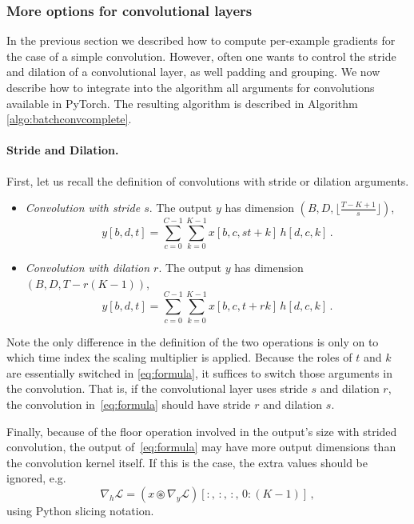 \documentclass[11pt]{article}
\begin{document}
\subsubsection{More options for convolutional layers}
%
In the previous section we described how to compute per-example gradients for
the case of a simple convolution. However, often one wants to control the 
stride and dilation of a convolutional layer, as well padding and grouping. 
We now describe how to integrate into the algorithm all arguments for
convolutions available in PyTorch. The resulting algorithm is described in
Algorithm \ref{algo:batchconvcomplete}.

\paragraph{Stride and Dilation.}
%
First, let us recall the definition of convolutions with stride or dilation arguments.\\
%
\begin{itemize}
\item \emph{Convolution with stride $s$}.  The output $y$ has dimension $(B, D, \lfloor \frac{T-K+1}{s} \rfloor)$,
\begin{equation*}
        y[b, d, t] = \sum_{c=0}^{C-1} \sum_{k=0}^{K-1} x[b, c, s t + k] \, h[d, c, k] \, .
    \end{equation*}
\item \emph{Convolution with dilation $r$}. The output $y$ has dimension $(B, D, T - r (K-1))$,
    \begin{equation*}
        y[b, d, t] = \sum_{c=0}^{C-1} \sum_{k=0}^{K-1} x[b, c, t + r k] \, h[d, c, k] \, .
    \end{equation*}
\end{itemize}
%
Note the only difference in the definition of the two operations is only on to which
time index the scaling multiplier is applied.
Because the roles of $t$ and $k$ are essentially switched in \eqref{eq:formula}, 
it suffices to switch those arguments in the convolution.
That is, if the convolutional layer uses stride $s$ and dilation $r$, the
convolution in~\eqref{eq:formula} should have stride $r$ and dilation
$s$.

Finally, because of the floor operation involved in the output's
size with strided convolution, the output of~\eqref{eq:formula} may have more
output dimensions
than the convolution kernel itself. If this is the case, the extra values
should be ignored, e.g.
\begin{equation*}
    \nabla_h \mathcal{L}
    = \left(x \circledast \nabla_y\mathcal{L}\right)
    [:,\, :,\, :,\, 0:(K-1)] \, ,
\end{equation*}
using Python slicing notation.
\end{document}
